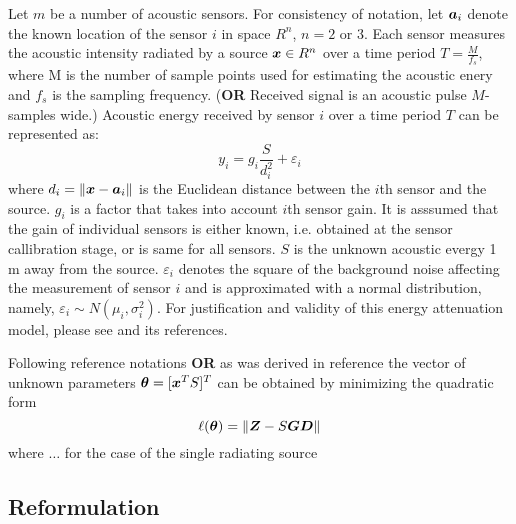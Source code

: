 Let $m$ be a number of acoustic sensors. For consistency of notation, let $\mbox{\boldmath$a$}_i$ denote the known location of the sensor $i$ in space $R^n$, $n = 2$ or $3$. Each sensor measures the acoustic intensity radiated by a source $\mbox{\boldmath$x$}\in R^n$ over a time period $T = \frac{M}{f_s}$, where M is the number of sample points used for estimating the acoustic enery and $f_s$ is the sampling frequency.  (\textbf{OR} Received signal is an acoustic pulse $M$-samples wide.)
 Acoustic energy received by sensor $i$ over a time period $T$ can be represented as:
\begin{equation}
y_i = g_i \frac{S}{d_i^2} + \varepsilon_i
\end{equation}
where $d_i = \|\mbox{\boldmath$x$} - \mbox{\boldmath$a$}_i\|$ is the Euclidean distance between the $i$th sensor and the source. $g_i$ is a factor that takes into account $i$th sensor gain. It is asssumed that the gain of individual sensors is either known, i.e. obtained at the sensor callibration stage, or is same for all sensors. $S$ is the unknown acoustic evergy 1 m away from the source. $\varepsilon_i$ denotes the square of the background noise affecting the measurement of sensor $i$ and is approximated with a normal distribution, namely, $\varepsilon_i \sim N(\mu_i, \sigma_i^2)$. For justification and validity of this energy attenuation model, please see \cite{ShengHu} and its references. 


Following reference \cite{ShengHu} notations \textbf{OR} as was derived in reference \cite{ShengHu}
the vector of unknown parameters $\mbox{\boldmath${\theta}$} = [\mbox{\boldmath$x$}^T S]^T$ can be obtained by minimizing the quadratic form 
\begin{equation}
\nonumber
\ell(\mbox{\boldmath${\theta}$}) = \|\mbox{\boldmath$Z$} - S\mbox{\boldmath{$G$}}\mbox{\boldmath$D$}\|
\end{equation}
where $\ldots$ for the case of the single radiating source
\subsection{Reformulation}